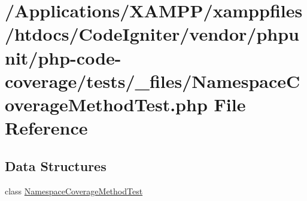 \hypertarget{php-code-coverage_2tests_2__files_2_namespace_coverage_method_test_8php}{}\section{/\+Applications/\+X\+A\+M\+P\+P/xamppfiles/htdocs/\+Code\+Igniter/vendor/phpunit/php-\/code-\/coverage/tests/\+\_\+files/\+Namespace\+Coverage\+Method\+Test.php File Reference}
\label{php-code-coverage_2tests_2__files_2_namespace_coverage_method_test_8php}
\subsection*{Data Structures}
\begin{DoxyCompactItemize}
\item 
class \mbox{\hyperlink{class_namespace_coverage_method_test}{Namespace\+Coverage\+Method\+Test}}
\end{DoxyCompactItemize}
